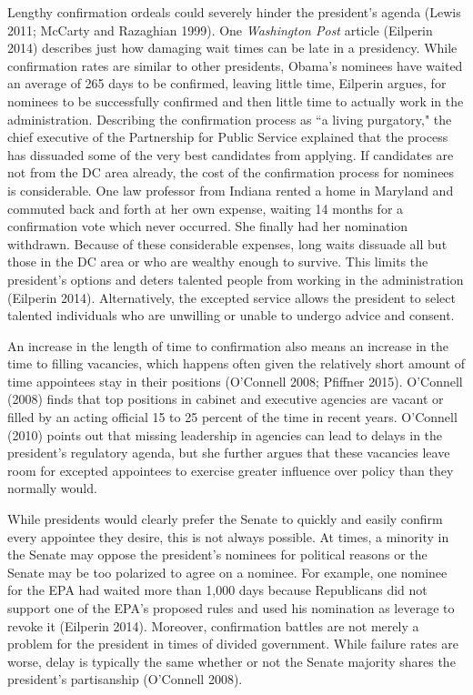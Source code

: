 \documentclass[12pt]{article}
\begin{document}
Lengthy confirmation ordeals could severely hinder the president's agenda (Lewis 2011; McCarty and Razaghian 1999). One \textit{Washington Post} article (Eilperin 2014) describes just how damaging wait times can be late in a presidency. While confirmation rates are similar to other presidents, Obama's nominees have waited an average of 265 days to be confirmed, leaving little time, Eilperin argues, for nominees to be successfully confirmed and then little time to actually work in the administration. Describing the confirmation process as ``a living purgatory," the chief executive of the Partnership for Public Service explained that the process has dissuaded some of the very best candidates from applying. If candidates are not from the DC area already, the cost of the confirmation process for nominees is considerable. One law professor from Indiana rented a home in Maryland and commuted back and forth at her own expense, waiting 14 months for a confirmation vote which never occurred. She finally had her nomination withdrawn. Because of these considerable expenses, long waits dissuade all but those in the DC area or who are wealthy enough to survive. This limits the president's options and deters talented people from working in the administration (Eilperin 2014). Alternatively, the excepted service allows the president to select talented individuals who are unwilling or unable to undergo advice and consent. 

An increase in the length of time to confirmation also means an increase in the time to filling vacancies, which happens often given the relatively short amount of time appointees stay in their positions (O'Connell 2008; Pfiffner 2015). O'Connell (2008) finds that top positions in cabinet and executive agencies are vacant or filled by an acting official 15 to 25 percent of the time in recent years. O'Connell (2010) points out that missing leadership in agencies can lead to delays in the president's regulatory agenda, but she further argues that these vacancies leave room for excepted appointees to exercise greater influence over policy than they normally would.

While presidents would clearly prefer the Senate to quickly and easily confirm every appointee they desire, this is not always possible. At times, a minority in the Senate may oppose the president's nominees for political reasons or the Senate may be too polarized to agree on a nominee. For example, one nominee for the EPA had waited more than 1,000 days because Republicans did not support one of the EPA's proposed rules and used his nomination as leverage to revoke it (Eilperin 2014). Moreover, confirmation battles are not merely a problem for the president in times of divided government. While failure rates are worse, delay is typically the same whether or not the Senate majority shares the president's partisanship (O'Connell 2008).  
\end{document}
